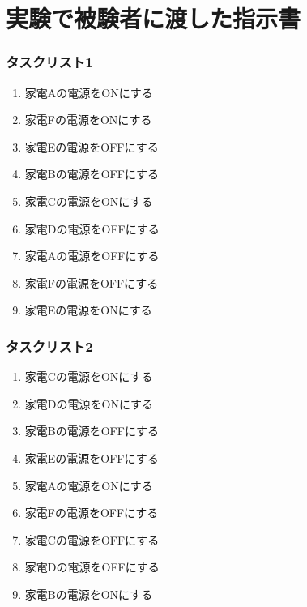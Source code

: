 \documentclass[a4j,12pt,twoside]{jreport}
\begin{document}
\chapter{実験で被験者に渡した指示書}
\label{sec:指示}
\begin{multicols}{2}
\subsection*{タスクリスト1}
	\begin{enumerate}
		\item 家電Aの電源をONにする
		\item 家電Fの電源をONにする
		\item 家電Eの電源をOFFにする
		\item 家電Bの電源をOFFにする
		\item 家電Cの電源をONにする
		\item 家電Dの電源をOFFにする
		\item 家電Aの電源をOFFにする
		\item 家電Fの電源をOFFにする		
		\item 家電Eの電源をONにする
	\end{enumerate}
\subsection*{タスクリスト2}
	\begin{enumerate}
		\item 家電Cの電源をONにする
		\item 家電Dの電源をONにする
		\item 家電Bの電源をOFFにする
		\item 家電Eの電源をOFFにする
		\item 家電Aの電源をONにする
		\item 家電Fの電源をOFFにする
		\item 家電Cの電源をOFFにする
		\item 家電Dの電源をOFFにする
		\item 家電Bの電源をONにする
	\end{enumerate}
\end{multicols}
\end{document}
